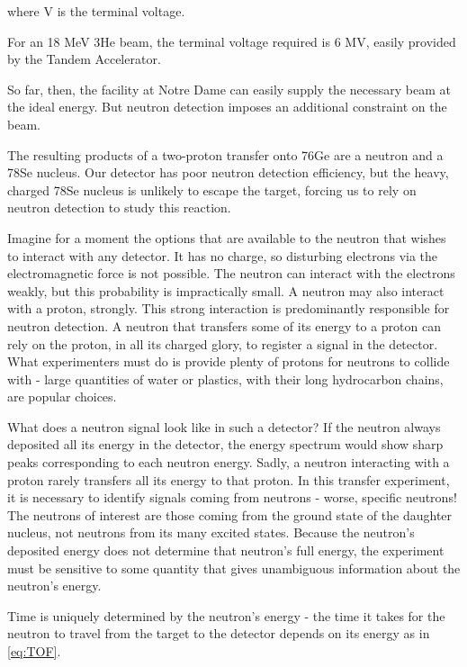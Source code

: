 where V is the terminal voltage.

For an 18 MeV 3He beam, the terminal voltage required is 6 MV, easily provided by the Tandem Accelerator.

So far, then, the facility at Notre Dame can easily supply the necessary beam at the ideal energy.  But neutron detection imposes an additional constraint on the beam.

The resulting products of a two-proton transfer onto 76Ge are a neutron and a 78Se nucleus.  Our detector has poor neutron detection efficiency, but the heavy, charged 78Se nucleus is unlikely to escape the target, forcing us to rely on neutron detection to study this reaction.  

Imagine for a moment the options that are available to the neutron that wishes to interact with any detector.  It has no charge, so disturbing electrons via the electromagnetic force is not possible.  The neutron can interact with the electrons weakly, but this probability is impractically small.  A neutron may also interact with a proton, strongly.  This strong interaction is predominantly responsible for neutron detection.  A neutron that transfers some of its energy to a proton can rely on the proton, in all its charged glory, to register a signal in the detector.  What experimenters must do is provide plenty of protons for neutrons to collide with - large quantities of water or plastics, with their long hydrocarbon chains, are popular choices.

What does a neutron signal look like in such a detector?  If the neutron always deposited all its energy in the detector, the energy spectrum would show sharp peaks corresponding to each neutron energy.  Sadly, a neutron interacting with a proton rarely transfers all its energy to that proton.  In this transfer experiment, it is necessary to identify signals coming from neutrons - worse, specific neutrons!  The neutrons of interest are those coming from the ground state of the daughter nucleus, not neutrons from its many excited states.  Because the neutron's deposited energy does not determine that neutron's full energy, the experiment must be sensitive to some quantity that gives unambiguous information about the neutron's energy.


Time is uniquely determined by the neutron's energy - the time it takes for the neutron to travel from the target to the detector depends on its energy as in \eq \ref{eq:TOF}.  

